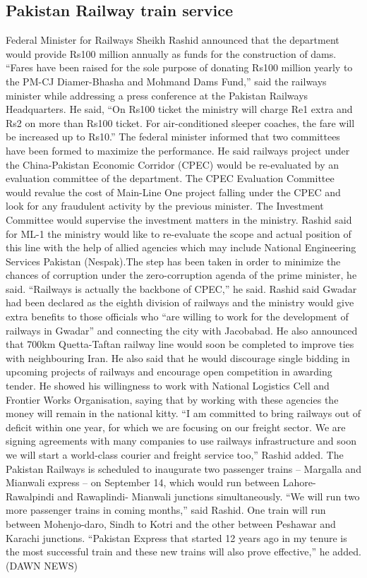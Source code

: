 \documentclass[11pt, journal,letterpaper,compsoc]{IEEEtran}
\begin{document}
\subsection{Pakistan Railway train service}
Federal Minister for Railways Sheikh Rashid announced that the department would provide Rs100 million annually as funds for the construction of dams.
“Fares have been raised for the sole purpose of donating Rs100 million yearly to the PM-CJ Diamer-Bhasha and Mohmand Dams Fund,” said the railways minister while addressing a press conference at the Pakistan Railways Headquarters.
He said, “On Rs100 ticket the ministry will charge Re1 extra and Rs2 on more than Rs100 ticket. For air-conditioned sleeper coaches, the fare will be increased up to Rs10.” 
The federal minister informed that two committees have been formed to maximize the performance. He said railways project under the China-Pakistan Economic Corridor (CPEC) would be re-evaluated by an evaluation committee of the department.
The CPEC Evaluation Committee would revalue the cost of Main-Line One project falling under the CPEC and look for any fraudulent activity by the previous minister. The Investment Committee would supervise the investment matters in the ministry.
Rashid said for ML-1 the ministry would like to re-evaluate the scope and actual position of this line with the help of allied agencies which may include National Engineering Services Pakistan (Nespak).The step has been taken in order to minimize the chances of corruption under the zero-corruption agenda of the prime minister, he said. “Railways is actually the backbone of CPEC,” he said. Rashid said Gwadar had been declared as the eighth division of railways and the ministry would give extra benefits to those officials who “are willing to work for the development of railways in Gwadar” and connecting the city with Jacobabad.
He also announced that 700km Quetta-Taftan railway line would soon be completed to improve ties with neighbouring Iran. He also said that he would discourage single bidding in upcoming projects of railways and encourage open competition in awarding tender.
He showed his willingness to work with National Logistics Cell and Frontier Works Organisation, saying that by working with these agencies the money will remain in the national kitty.
“I am committed to bring railways out of deficit within one year, for which we are focusing on our freight sector.
We are signing agreements with many companies to use railways infrastructure and soon we will start a world-class courier and freight service too,” Rashid added.
The Pakistan Railways is scheduled to inaugurate two passenger trains – Margalla and Mianwali express – on September 14, which would run between Lahore-Rawalpindi and Rawaplindi- Mianwali junctions simultaneously. “We will run two more passenger trains in coming months,” said Rashid.
One train will run between Mohenjo-daro, Sindh to Kotri and the other between Peshawar and Karachi junctions. “Pakistan Express that started 12 years ago in my tenure is the most successful train and these new trains will also prove effective,” he added.(DAWN NEWS)
\end{document}
